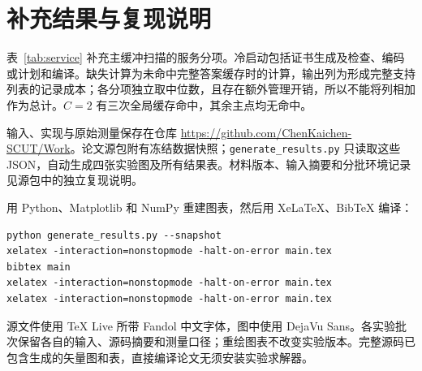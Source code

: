 \section{补充结果与复现说明}\label{app:results}
表~\ref{tab:service} 补充主缓冲扫描的服务分项。冷启动包括证书生成及检查、编码或计划和编译。缺失计算为未命中完整答案缓存时的计算，输出列为形成完整支持列表的记录成本；各分项独立取中位数，且存在额外管理开销，所以不能将列相加作为总计。$C=2$ 有三次全局缓存命中，其余主点均无命中。

\begin{table}[p]
\centering\small
\caption{主缓冲扫描的服务成本细项，单位秒。$r/C$ 为轮数／容量，$U$ 为不同假设数，答案为不同完整支持答案数。成功点三次中位数；未完成不填最终请求统计。}\label{tab:service}

\end{table}

\begin{table}[t]
\centering\footnotesize
\caption{$16$ 轮机制对照。时间为秒，查询部分为 $100$ 次完整支持请求。前三行来自冻结的机制批次，最后两行来自匹配的长写间隔对照，各行均三次中位数；只在对应组内比较。}\label{tab:mechanism}
\resizebox{\linewidth}{!}{}
\end{table}

输入、实现与原始测量保存在仓库 \url{https://github.com/ChenKaichen-SCUT/Work}。论文源包附有冻结数据快照；\texttt{generate\_results.py} 只读取这些 JSON，自动生成四张实验图及所有结果表。材料版本、输入摘要和分批环境记录见源包中的独立复现说明。

用 Python、Matplotlib 和 NumPy 重建图表，然后用 XeLaTeX、BibTeX 编译：
\begin{verbatim}
python generate_results.py --snapshot
xelatex -interaction=nonstopmode -halt-on-error main.tex
bibtex main
xelatex -interaction=nonstopmode -halt-on-error main.tex
xelatex -interaction=nonstopmode -halt-on-error main.tex
\end{verbatim}
源文件使用 TeX Live 所带 Fandol 中文字体，图中使用 DejaVu Sans。各实验批次保留各自的输入、源码摘要和测量口径；重绘图表不改变实验版本。完整源码已包含生成的矢量图和表，直接编译论文无须安装实验求解器。
